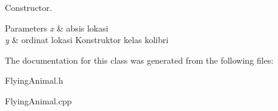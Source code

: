 Constructor. 


\begin{DoxyParams}{Parameters}
{\em x} & absis lokasi \\
\hline
{\em y} & ordinat lokasi Konstruktor kelas kolibri \\
\hline
\end{DoxyParams}


The documentation for this class was generated from the following files\+:\begin{DoxyCompactItemize}
\item 
Flying\+Animal.\+h\item 
Flying\+Animal.\+cpp\end{DoxyCompactItemize}
